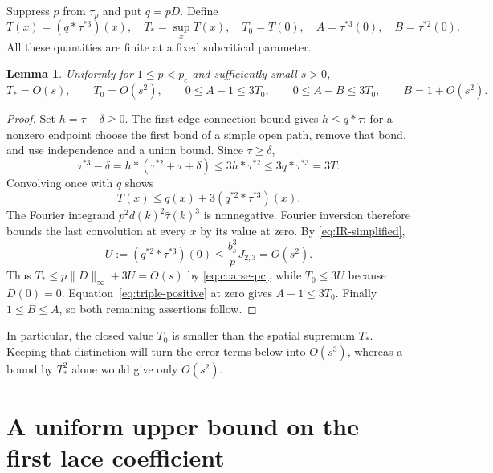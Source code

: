 \documentclass[11pt]{article}
\newtheorem{lemma}[theorem]{Lemma}
\theoremstyle{definition}
\begin{document}
Suppress $p$ from $\tau_p$ and put $q=pD$. Define
\begin{equation}\label{eq:diagram-defs}
 T(x)=(q*\tau^{*3})(x),\quad T_* =\sup_xT(x),\quad
 T_0=T(0),\quad A=\tau^{*3}(0),\quad B=\tau^{*2}(0).
\end{equation}
All these quantities are finite at a fixed subcritical parameter.

\begin{lemma}\label{lem:budget}
Uniformly for $1\le p<p_c$ and sufficiently small $s>0$,
\begin{equation}\label{eq:budget}
 T_*=O(s),\qquad T_0=O(s^2),\qquad
 0\le A-1\le3T_0,\qquad0\le A-B\le3T_0,
 \qquad B=1+O(s^2).
\end{equation}
\end{lemma}

\begin{proof}
Set $h=\tau-\delta\ge0$. The first-edge connection bound gives
$h\le q*\tau$: for a nonzero endpoint choose the first bond of a simple
open path, remove that bond, and use independence and a union bound.
Since $\tau\ge\delta$,
\begin{equation}\label{eq:triple-positive}
 \tau^{*3}-\delta
 =h*(\tau^{*2}+\tau+\delta)
 \le3h*\tau^{*2}\le3q*\tau^{*3}=3T.
\end{equation}
Convolving once with $q$ shows
\[
 T(x)\le q(x)+3(q^{*2}*\tau^{*3})(x).
\]
The Fourier integrand $p^2d(k)^2\widehat\tau(k)^3$ is nonnegative.
Fourier inversion therefore bounds the last convolution at every $x$ by
its value at zero. By \eqref{eq:IR-simplified},
\begin{equation}\label{eq:U}
 U:=(q^{*2}*\tau^{*3})(0)
 \le\frac{b_s^3}{p}J_{2,3}=O(s^2).
\end{equation}
Thus $T_*\le p\|D\|_\infty+3U=O(s)$ by
\eqref{eq:coarse-pc}, while $T_0\le3U$ because $D(0)=0$.
Equation~\eqref{eq:triple-positive} at zero gives $A-1\le3T_0$.
Finally $1\le B\le A$, so both remaining assertions follow.
\end{proof}

In particular, the closed value $T_0$ is smaller than the spatial
supremum $T_*$. Keeping that distinction will turn the error terms below
into $O(s^3)$, whereas a bound by $T_*^2$ alone would give only $O(s^2)$.

\section{A uniform upper bound on the first lace coefficient}
\label{sec:pi1}
\end{document}
